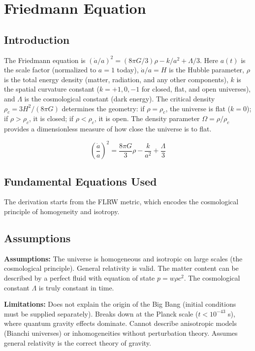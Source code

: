 \chapter{Friedmann Equation}

\section*{Introduction}

The Friedmann equation is $(\dot{a}/a)^2 = (8\pi G/3)\rho - k/a^2 + \Lambda/3$. Here $a(t)$ is the scale factor (normalized to $a = 1$ today), $\dot{a}/a = H$ is the Hubble parameter, $\rho$ is the total energy density (matter, radiation, and any other components), $k$ is the spatial curvature constant ($k = +1, 0, -1$ for closed, flat, and open universes), and $\Lambda$ is the cosmological constant (dark energy). The critical density $\rho_c = 3H^2/(8\pi G)$ determines the geometry: if $\rho = \rho_c$, the universe is flat ($k = 0$); if $\rho > \rho_c$, it is closed; if $\rho < \rho_c$, it is open. The density parameter $\Omega = \rho/\rho_c$ provides a dimensionless measure of how close the universe is to flat.


\[
\left(\frac{\dot{a}}{a}\right)^2 = \frac{8\pi G}{3}\rho - \frac{k}{a^2} + \frac{\Lambda}{3}
\]

\section*{Fundamental Equations Used}

The derivation starts from the FLRW metric, which encodes the cosmological principle of homogeneity and isotropy.

\section*{Assumptions}

\textbf{Assumptions:} The universe is homogeneous and isotropic on large scales (the cosmological principle). General relativity is valid. The matter content can be described by a perfect fluid with equation of state $p = w\rho c^2$. The cosmological constant $\Lambda$ is truly constant in time.


\textbf{Limitations:} Does not explain the origin of the Big Bang (initial conditions must be supplied separately). Breaks down at the Planck scale ($t < 10^{-43}$ s), where quantum gravity effects dominate. Cannot describe anisotropic models (Bianchi universes) or inhomogeneities without perturbation theory. Assumes general relativity is the correct theory of gravity.



